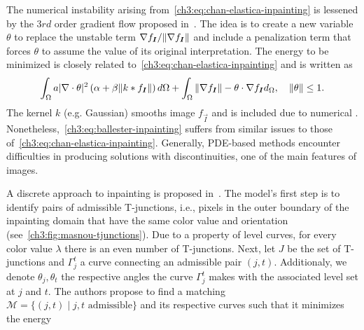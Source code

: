 The numerical instability arising from~\cref{ch3:eq:chan-elastica-inpainting} is lessened by the $3rd$ order gradient flow proposed in~\cite{ballester01filling}. The idea is to create a new variable $\theta$ to replace the unstable term $\nabla f_{\bm{I}} / \lVert\nabla f_{\bm{I}}\rVert$ and include a penalization term that forces $\theta$ to assume the value of its original interpretation. The energy to be minimized is closely related to~\cref{ch3:eq:chan-elastica-inpainting} and is written as
\begin{align}
	\int_{\Omega}{a|\nabla \cdot \theta|^2\left(\alpha + \beta \lVert k * f_{\bm{I}} \rVert\right)d\Omega} + \int_{\Omega}{ \lVert\nabla f_{\bm{I}} \rVert - \theta \cdot \nabla f_{\bm{I}} d_{\Omega}},\quad \lVert\theta\rVert \leq 1.
	\label{ch3:eq:ballester-inpainting}
\end{align}
%
The kernel $k$ (e.g. Gaussian) smooths image $f_{\vec{I}}$ and is included due to numerical . Nonetheless,~\cref{ch3:eq:ballester-inpainting} suffers from similar issues to those of~\cref{ch3:eq:chan-elastica-inpainting}. Generally, PDE-based methods encounter difficulties in producing solutions with discontinuities, one of the main features of images.

A discrete approach to inpainting is proposed in~\cite{masnou98inpainting}. The model's first step is to identify pairs of admissible T-junctions, i.e., pixels in the outer boundary of the inpainting domain that have the same color value and orientation (see~\cref{ch3:fig:masnou-tjunctions}). Due to a property of level curves, for every color value $\lambda$ there is an even number of T-junctions. Next, let $J$ be the set of T-junctions and $\Gamma_j^t$ a curve connecting an admissible pair $(j,t)$. Additionaly, we denote $\theta_j,\theta_t$ the respective angles the curve $\Gamma_j^t$ makes with the associated level set at $j$ and $t$. The authors propose to find a matching $\mathcal{M}=\{ (j,t) \; | \; j,t\text{ admissible} \}$ and its respective curves such that it minimizes the energy

